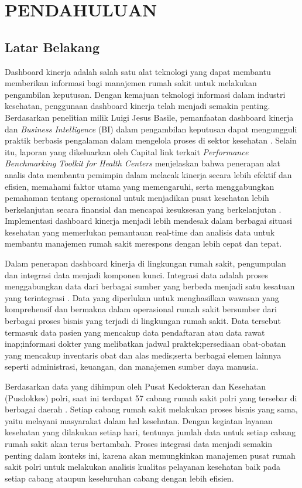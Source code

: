\chapter{PENDAHULUAN}

\section{Latar Belakang}
Dashboard kinerja adalah salah satu alat teknologi yang dapat membantu memberikan informasi bagi manajemen rumah sakit untuk melakukan pengambilan keputusan. Dengan kemajuan teknologi informasi dalam industri kesehatan, penggunaan dashboard kinerja telah menjadi semakin penting. Berdasarkan penelitian milik Luigi Jesus Basile, pemanfaatan dashboard kinerja dan \emph{Business Intelligence} (BI) dalam pengambilan keputusan dapat mengungguli praktik berbasis pengalaman dalam mengelola proses di sektor kesehatan \parencite{Basile2023}. Selain itu, laporan yang dikeluarkan oleh Capital link terkait \emph{Performance Benchmarking Toolkit for Health Centers} menjelaskan bahwa penerapan alat analis data membantu pemimpin dalam melacak kinerja secara lebih efektif dan efisien, memahami faktor utama yang memengaruhi, serta menggabungkan pemahaman tentang operasional untuk menjadikan pusat kesehatan lebih berkelanjutan secara finansial dan mencapai kesuksesan yang berkelanjutan \parencite{CapitalLink2017}. Implementasi dashboard kinerja menjadi lebih mendesak dalam berbagai situasi kesehatan yang memerlukan pemantauan real-time dan analisis data untuk membantu manajemen rumah sakit merespons dengan lebih cepat dan tepat.


Dalam penerapan dashboard kinerja di lingkungan rumah sakit, pengumpulan dan integrasi data menjadi komponen kunci. Integrasi data adalah proses menggabungkan data dari berbagai sumber yang berbeda menjadi satu kesatuan yang terintegrasi \parencite{Neang2021DataIA}. Data yang diperlukan untuk menghasilkan wawasan yang komprehensif dan bermakna dalam operasional rumah sakit bersumber dari berbagai proses bisnis yang terjadi di lingkungan rumah sakit. Data tersebut termasuk data pasien yang mencakup data pendaftaran atau data rawat inap;informasi dokter yang melibatkan jadwal praktek;persediaan obat-obatan yang mencakup inventaris obat dan alas medis;serta berbagai elemen lainnya seperti administrasi, keuangan, dan manajemen sumber daya manusia.


Berdasarkan data yang dihimpun oleh Pusat Kedokteran dan Kesehatan (Pusdokkes) polri, saat ini terdapat 57 cabang rumah sakit polri yang tersebar di berbagai daerah \parencite{Aziz2023OptimalisasiPD}. Setiap cabang rumah sakit melakukan proses bisnis yang sama, yaitu melayani masyarakat dalam hal kesehatan. Dengan kegiatan layanan kesehatan yang dilakukan setiap hari, tentunya jumlah data untuk setiap cabang rumah sakit akan terus bertambah. Proses integrasi data menjadi semakin penting dalam konteks ini, karena akan memungkinkan manajemen pusat rumah sakit polri untuk melakukan analisis kualitas pelayanan kesehatan baik pada setiap cabang ataupun keseluruhan cabang dengan lebih efisien.



